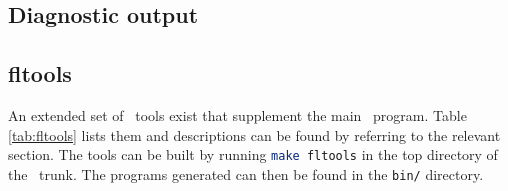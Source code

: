 \begin{landscape}
\begin{longtable}{|c | p{}| |p{}|}
\end{longtable}
\end{landscape}

\subsection{Diagnostic output}
\label{sect:diagnostic_output}

\subsection{fltools}
\label{sect:fltools}
An extended set of \fluidity\ tools exist that supplement the main
\fluidity\ program. Table \ref{tab:fltools} lists them and descriptions can
be found by referring to the relevant section. The tools can be built by
running \lstinline[language = bash]+make fltools+ in the top directory of
the \fluidity\ trunk. The programs generated can then be found in the
\lstinline[language = bash]+bin/+ directory.

